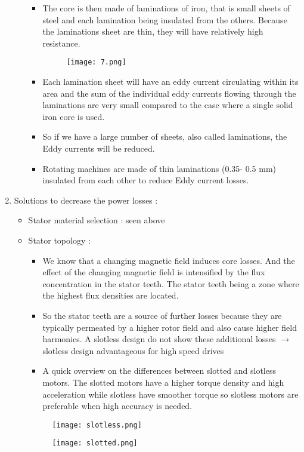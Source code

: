 \begin{enumerate}
\begin{enumerate}
\begin{itemize}
            \item 	The core is then made of laminations of iron, that is small sheets of steel and each lamination being insulated from the others. Because the laminations sheet are thin, they will have relatively high resistance. 
            
            \begin{figure}[H]
                \centering
                \texttt{[image: 7.png]}
                \caption{}
            \end{figure}
            
            \item 	Each lamination sheet will have an eddy current circulating within its area and the sum of the individual eddy currents flowing through the laminations are very small compared to the case where a single solid iron core is used.
            \item 	So if we have a large number of sheets, also called laminations, the Eddy currents will be reduced.
            \item 	Rotating machines are made of thin laminations (0.35- 0.5 mm) insulated from each other to reduce Eddy current losses.
        \end{itemize}
    \end{enumerate}
    \item Solutions to decrease the power losses : 
        \begin{itemize}
            \item Stator material selection : seen above 
            \item Stator topology : 
            \begin{itemize}
                \item 	We know that a changing magnetic field induces core losses. And the effect of the changing magnetic field is intensified by the flux concentration in the stator teeth. The stator teeth being a zone where the highest flux densities are located.
                \item 	So the stator teeth are a source of further losses because they are typically permeated by a higher rotor field and also cause higher field harmonics. A slotless design do not show these additional losses $\rightarrow$ slotless design advantageous for high speed drives 
                \item 	A quick overview on the differences between slotted and slotless motors. The slotted motors have a higher torque density and high acceleration while slotless have smoother torque so slotless motors are preferable when high accuracy is needed.
            \end{itemize}
\begin{figure}[H]
   \begin{minipage}[c]{.46\linewidth}
      \texttt{[image: slotless.png]}
   \end{minipage} \hfill
   \begin{minipage}[c]{.46\linewidth}
      \texttt{[image: slotted.png]}
   \end{minipage}
\end{figure}


\end{itemize}
\end{enumerate}
